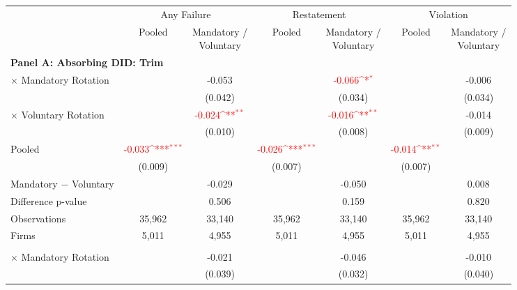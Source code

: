 \documentclass[10pt]{article}
\newcommand{\sym}[1]{\textsuperscript{#1}}
\begin{document}
\begin{minipage}{19cm}\fontsize{10}{12}\selectfont\setlength{\tabcolsep}{4pt}\renewcommand{\arraystretch}{1.12}


\def\sym#1{\ifmmode^{#1}\else\(^{#1}\)\fi}
\centering
{}
\label{tab:absorbing-transition-clean-historical-restatement-upgrade-no-auditfirm-fe}
\begin{threeparttable}

\begin{tabular}{l cc cc cc}
\toprule
 & \multicolumn{2}{c}{Any Failure} & \multicolumn{2}{c}{Restatement} & \multicolumn{2}{c}{Violation} \\
\cmidrule(lr){2-3}\cmidrule(lr){4-5}\cmidrule(lr){6-7}
 & Pooled & \shortstack{Mandatory /\\Voluntary} & Pooled & \shortstack{Mandatory /\\Voluntary} & Pooled & \shortstack{Mandatory /\\Voluntary} \\
\midrule
\multicolumn{7}{l}{\textbf{Panel A: Absorbing DID: Trim}} \\
$\times$ Mandatory Rotation &  & -0.053 &  & \textcolor{red}{-0.066\sym{*}} &  & -0.006 \\
 &  & (0.042) &  & (0.034) &  & (0.034) \\
$\times$ Voluntary Rotation &  & \textcolor{red}{-0.024\sym{**}} &  & \textcolor{red}{-0.016\sym{**}} &  & -0.014 \\
 &  & (0.010) &  & (0.008) &  & (0.009) \\
Pooled & \textcolor{red}{-0.033\sym{***}} &  & \textcolor{red}{-0.026\sym{***}} &  & \textcolor{red}{-0.014\sym{**}} &  \\
 & (0.009) &  & (0.007) &  & (0.007) &  \\
Mandatory $-$ Voluntary &  & -0.029 &  & -0.050 &  & 0.008 \\
Difference p-value &  & 0.506 &  & 0.159 &  & 0.820 \\
Observations & 35,962 & 33,140 & 35,962 & 33,140 & 35,962 & 33,140 \\
Firms & 5,011 & 4,955 & 5,011 & 4,955 & 5,011 & 4,955 \\
\addlinespace
\multicolumn{7}{l}{\textbf{Panel B: Absorbing DID: Strict}} \\
$\times$ Mandatory Rotation &  & -0.021 &  & -0.046 &  & -0.010 \\
 &  & (0.039) &  & (0.032) &  & (0.040) \\

\end{tabular}
\end{threeparttable}
\end{minipage}
\end{document}
